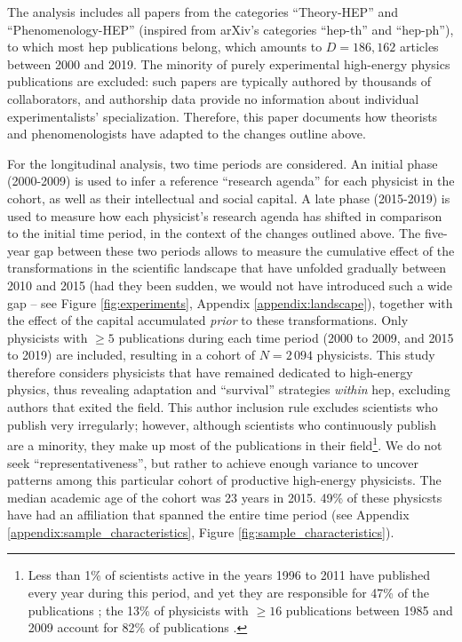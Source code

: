 \documentclass{article}
\begin{document}
The analysis includes all papers from the categories ``Theory-HEP'' and ``Phenomenology-HEP'' (inspired from arXiv's categories ``hep-th'' and ``hep-ph''), to which most \gls{hep} publications belong, which amounts to $D=186,162$ articles between 2000 and 2019. The minority of purely experimental high-energy physics publications are excluded: such papers are typically authored by thousands of collaborators, and authorship data provide no information about individual experimentalists' specialization. Therefore, this paper documents how theorists and phenomenologists have adapted to the changes outline above.

For the longitudinal analysis, two time periods are considered. An initial phase (2000-2009) is used to infer a reference ``research agenda'' for each physicist in the cohort, as well as their intellectual and social capital. A late phase (2015-2019) is used to measure how each physicist's research agenda has shifted in comparison to the initial time period, in the context of the changes outlined above. The five-year gap between these two periods allows to measure the cumulative effect of the transformations in the scientific landscape that have unfolded gradually between 2010 and 2015 (had they been sudden, we would not have introduced such a wide gap -- see Figure \ref{fig:experiments}, Appendix \ref{appendix:landscape}), together with the effect of the capital accumulated \textit{prior} to these transformations. Only physicists with $\geq 5$ publications during each time period (2000 to 2009, and 2015 to 2019) are included, resulting in a cohort of $N=2\,094$ physicists. This study therefore considers physicists that have remained dedicated to high-energy physics, thus revealing adaptation and ``survival'' strategies \textit{within} \gls{hep}, excluding authors that exited the field. This author inclusion rule excludes scientists who publish very irregularly; however, although scientists who continuously publish are a minority, they make up most of the publications in their field\footnote{Less than 1\% of scientists active in the years 1996 to 2011 have published every year during this period, and yet they are responsible for 47\% of the publications \citep{Ioannidis2014}; the 13\% of physicists with $\geq 16$ publications between 1985 and 2009 account for 82\% of publications \citep{liu2024science}.}. We do not seek ``representativeness'', but rather to achieve enough variance to uncover patterns among this particular cohort of productive high-energy physicists. The median academic age of the cohort was 23 years in 2015. 49\% of these physicsts have had an affiliation that spanned the entire time period (see Appendix \ref{appendix:sample_characteristics}, Figure \ref{fig:sample_characteristics}). 
\end{document}

